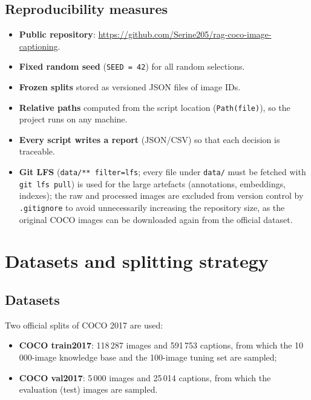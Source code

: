 \documentclass[11pt,a4paper]{article}
\renewcommand{\_}{\textunderscore\allowbreak{}}
\newcommand{\code}[1]{\texttt{#1}}
\begin{document}
\subsection{Reproducibility measures}
\begin{itemize}[nosep]
  \item \textbf{Public repository}: \url{https://github.com/Serine205/rag-coco-image-captioning}.
  \item \textbf{Fixed random seed} (\code{SEED = 42}) for all random selections.
  \item \textbf{Frozen splits} stored as versioned JSON files of image IDs.
  \item \textbf{Relative paths} computed from the script location (\code{Path(\_\_file\_\_)}), so the project runs on any machine.
  \item \textbf{Every script writes a report} (JSON/CSV) so that each decision is traceable.
  \item \textbf{Git LFS} (\code{data/** filter=lfs}; every file under \code{data/} must be fetched with \code{git lfs pull}) is used for the large artefacts (annotations, embeddings, indexes); the raw and processed images are excluded from version control by \code{.gitignore} to avoid unnecessarily increasing the repository size, as the original COCO images can be downloaded again from the official dataset.
\end{itemize}




\section{Datasets and splitting strategy}

\subsection{Datasets}
Two official splits of COCO 2017 are used:
\begin{itemize}[nosep]
  \item \textbf{COCO train2017}: 118\,287 images and 591\,753 captions, from which the 10\,000-image knowledge base and the 100-image tuning set are sampled;
  \item \textbf{COCO val2017}: 5\,000 images and 25\,014 captions, from which the evaluation (test) images are sampled.
\end{itemize}
\end{document}
